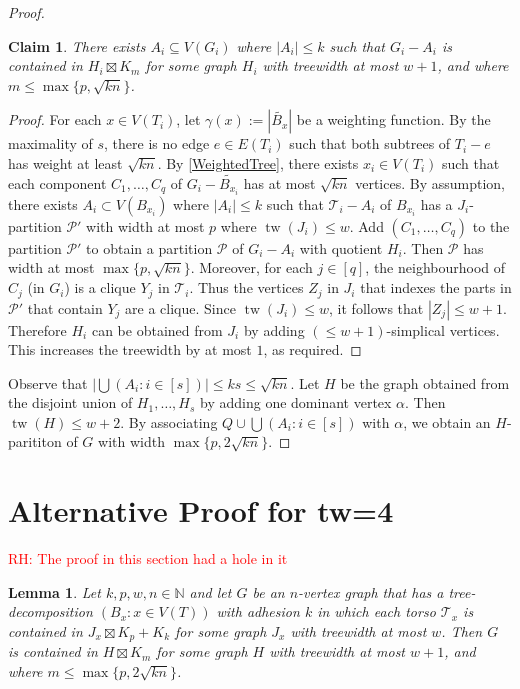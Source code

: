 \documentclass[12pt]{article}
\renewcommand{\leq}{\leqslant}
\DeclareMathOperator{\tw}{tw}
\newcommand{\PP}{\mathcal{P}}
\newcommand{\NN}{\mathbb{N}}
\newcommand{\robert}[1]{\textcolor{red}{RH: #1}}
\theoremstyle{plain}
\newtheorem{lem}[thm]{Lemma}
\newtheorem*{claim}{Claim}
\theoremstyle{definition}
\begin{document}
\begin{proof}
    \begin{claim}
        There exists $A_i\subseteq V(G_i)$ where $|A_i|\leq k$ such that $G_i-A_i$ is contained in $H_i\boxtimes K_m$ for some graph $H_i$ with treewidth at most $w+1$, and where $m\leq\max\{p,\sqrt{kn}\}$.
    \end{claim}
    \begin{proof}
        For each $x\in V(T_i)$, let $\gamma(x):=|\tilde{B_{x}}|$ be a weighting function.
        By the maximality of $s$, there is no edge $e\in E(T_i)$ such that both subtrees of $T_i-e$ has weight at least $\sqrt{kn}$. By \cref{WeightedTree}, there exists $x_i\in V(T_i)$ such that each component $C_1,\dots,C_q$ of $G_i-\tilde{B_{x_i}}$ has at most $\sqrt{kn}$ vertices.
        By assumption, there exists $A_i\subset V(B_{x_i})$ where $|A_i|\leq k$ such that $\mathcal{T}_i-A_i$ of $B_{x_i}$ has a $J_i$-partition $\PP'$ with width at most $p$ where $\tw(J_i)\leq w$. Add $(C_1,\dots, C_q)$ to the partition $\PP'$ to obtain a partition $\PP$ of $G_i-A_i$ with quotient $H_i$. Then $\PP$ has width at most $\max\{p,\sqrt{kn}\}$. Moreover, for each $j\in [q]$, the neighbourhood of $C_j$ (in $G_i$) is a clique $Y_j$ in $\mathcal{T}_i$. Thus the vertices $Z_j$ in $J_i$ that indexes the parts in $\PP'$ that contain $Y_j$ are a clique. Since $\tw(J_i)\leq w$, it follows that $|Z_j|\leq w+1$. Therefore $H_i$ can be obtained from $J_i$ by adding $(\leq w+1)$-simplical vertices. This increases the treewidth by at most $1$, as required.
    \end{proof}
    Observe that $|\bigcup (A_i: i \in [s])|\leq ks\leq \sqrt{kn}$.
    Let $H$ be the graph obtained from the disjoint union of $H_1,\dots, H_s$ by adding one dominant vertex $\alpha$. Then $\tw(H)\leq w+2$. By associating $Q\cup \bigcup (A_i: i \in [s])$ with $\alpha$, we obtain an $H$-parititon of $G$ with width $\max\{p,2\sqrt{kn}\}$.
\end{proof}


\section{Alternative Proof for tw=4}
\robert{The proof in this section had a hole in it}

  \begin{lem}\label{CliqueSumsApicesNew}
   Let $k,p,w,n\in \NN$ and let $G$ be an $n$-vertex graph that has a tree-decomposition $(B_x:x \in V(T))$ with adhesion $k$ in which each torso $\mathcal{T}_x$ is contained in $J_x\boxtimes K_p+K_k$ for some graph $J_x$ with treewidth at most $w$. Then $G$ is contained in $H\boxtimes K_m$ for some graph $H$ with treewidth at most $w+1$, and where $m\leq\max\{p,2\sqrt{kn}\}$.
\end{lem}
\end{document}
